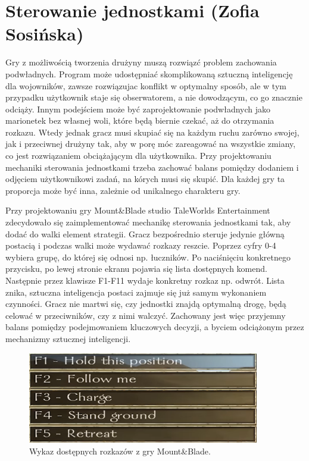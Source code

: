 \section{Sterowanie jednostkami (Zofia Sosińska)}\label{chap:mb}
Gry z możliwością tworzenia drużyny muszą rozwiązć problem zachowania podwładnych. Program może udostępniać
skomplikowaną sztuczną inteligencję dla wojowników, zawsze rozwiązujac konflikt w optymalny sposób, ale w tym przypadku 
użytkownik staje się obserwatorem, a nie dowodzącym, co go znacznie odciąży. Innym podejściem może być zaprojektowanie podwładnych jako 
marionetek bez własnej woli, które będą biernie czekać, aż do otrzymania rozkazu. Wtedy jednak gracz musi skupiać się na 
każdym ruchu zarówno swojej, jak i przeciwnej drużyny tak, aby w porę móc zareagować na wszystkie zmiany, co
jest rozwiązaniem obciążającym dla użytkownika. Przy projektowaniu mechaniki sterowania jednostkami trzeba zachować balans pomiędzy 
dodaniem i odjęciem użytkownikowi zadań, na kórych musi się skupić. Dla każdej gry ta proporcja może być inna, zależnie
od unikalnego charakteru gry.

Przy projektowaniu gry Mount\&Blade studio TaleWorlds Entertainment zdecydowało się zaimplementować mechanikę sterowania jednostkami tak, aby 
dodać do walki element strategii. Gracz bezpośrednio steruje jedynie główną postacią i podczas walki może wydawać rozkazy reszcie. Poprzez
cyfry 0-4 wybiera grupę, do której się odnosi np. łuczników. Po naciśnięciu konkretnego przycisku, po lewej stronie ekranu pojawia się lista dostępnych komend.
Następnie przez klawisze F1-F11 wydaje konkretny rozkaz np. odwrót. Lista znika, sztuczna inteligencja postaci zajmuje się już samym wykonaniem czynności. 
Gracz nie martwi się, czy jednostki znajdą optymalną drogę, 
będą celować w przeciwników, czy z nimi walczyć. Zachowany jest więc przyjemny balans pomiędzy podejmowaniem kluczowych decyzji, a byciem odciążonym przez mechanizmy sztucznej inteligencji.

\begin{figure}[h!tbp]
    \centering
    \includegraphics[width=0.9\textwidth]{images/ui/commandsMountBla.png}
    \caption{Wykaz dostępnych rozkazów z gry Mount\&Blade.}\label{fig:MountnBlade}
    \label{fig:mnb}
\end{figure}
